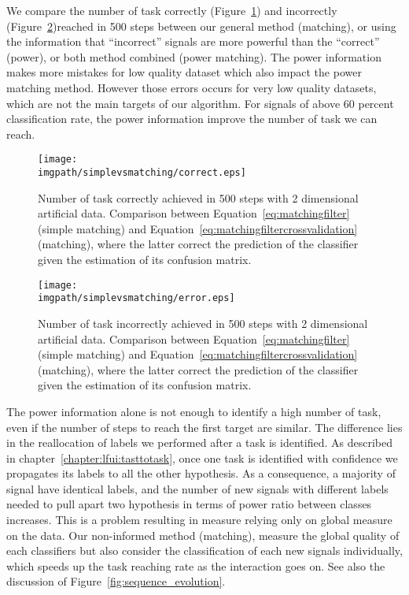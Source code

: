 We compare the number of task correctly (Figure~\ref{fig:nCorrect_simplevsmatching}) and incorrectly (Figure~\ref{fig:nWrongEEG_simplevsmatching})reached in 500 steps between our general method (matching), or using the information that ``incorrect'' signals are more powerful than the ``correct'' (power), or both method combined (power matching). The power information makes more mistakes for low quality dataset which also impact the power matching method. However those errors occurs for very low quality datasets, which are not the main targets of our algorithm. For signals of above 60 percent classification rate, the power information improve the number of task we can reach. 

\begin{figure}[!ht]
\centering
\texttt{[image: \\imgpath/simplevsmatching/correct.eps]}
\caption{Number of task correctly achieved in 500 steps with 2 dimensional artificial data. Comparison between Equation~\ref{eq:matchingfilter} (simple matching) and Equation~\ref{eq:matchingfiltercrossvalidation} (matching), where the latter correct the prediction of the classifier given the estimation of its confusion matrix. 
}
\label{fig:nCorrect_simplevsmatching}
\end{figure} 

\begin{figure}[!ht]
\centering
\texttt{[image: \\imgpath/simplevsmatching/error.eps]}
\caption{Number of task incorrectly achieved in 500 steps with 2 dimensional artificial data. Comparison between Equation~\ref{eq:matchingfilter} (simple matching) and Equation~\ref{eq:matchingfiltercrossvalidation} (matching), where the latter correct the prediction of the classifier given the estimation of its confusion matrix.
}
\label{fig:nWrongEEG_simplevsmatching}
\end{figure} 


The power information alone is not enough to identify a high number of task, even if the number of steps to reach the first target are similar. The difference lies in the reallocation of labels we performed after a task is identified. As described in chapter~\ref{chapter:lfui:tasttotask}, once one task is identified with confidence we propagates its labels to all the other hypothesis. As a consequence, a majority of signal have identical labels, and the number of new signals with different labels needed to pull apart two hypothesis in terms of power ratio between classes increases. This is a problem resulting in measure relying only on global measure on the data. Our non-informed method (matching), measure the global quality of each classifiers but also consider the classification of each new signals individually, which speeds up the task reaching rate as the interaction goes on. See also the discussion of Figure~\ref{fig:sequence_evolution}.


